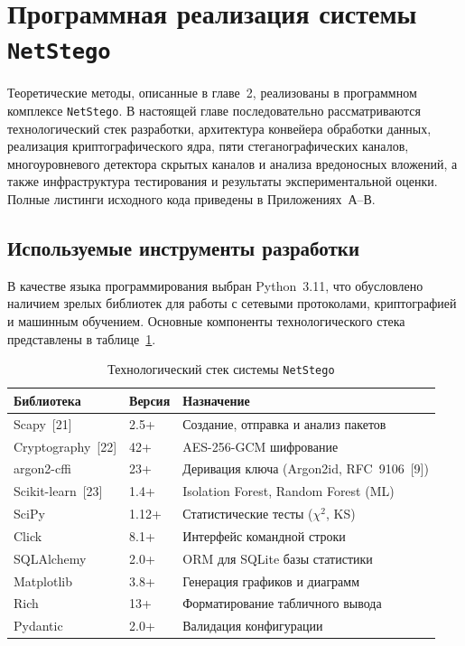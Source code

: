 \section{Программная реализация системы \texttt{NetStego}}

Теоретические методы, описанные в главе~2, реализованы в программном комплексе \texttt{NetStego}. В настоящей главе последовательно рассматриваются технологический стек разработки, архитектура конвейера обработки данных, реализация криптографического ядра, пяти стеганографических каналов, многоуровневого детектора скрытых каналов и анализа вредоносных вложений, а также инфраструктура тестирования и результаты экспериментальной оценки. Полные листинги исходного кода приведены в Приложениях~А--В.

\subsection{Используемые инструменты разработки}

В качестве языка программирования выбран Python~3.11, что обусловлено наличием зрелых библиотек для работы с сетевыми протоколами, криптографией и машинным обучением. Основные компоненты технологического стека представлены в таблице~\ref{tab:tech_stack}.

\begin{table}[htb]
\centering
\caption{Технологический стек системы \texttt{NetStego}}
\label{tab:tech_stack}
\small
\begin{tabular}{|l|l|p{7cm}|}
\hline
Библиотека & Версия & Назначение \\
\hline
Scapy~[21]          & 2.5+  & Создание, отправка и анализ пакетов \\
Cryptography~[22]   & 42+   & AES-256-GCM шифрование \\
argon2-cffi          & 23+   & Деривация ключа (Argon2id, RFC~9106~[9]) \\
Scikit-learn~[23]    & 1.4+  & Isolation Forest, Random Forest (ML) \\
SciPy                & 1.12+ & Статистические тесты ($\chi^2$, KS) \\
Click                & 8.1+  & Интерфейс командной строки \\
SQLAlchemy           & 2.0+  & ORM для SQLite базы статистики \\
Matplotlib           & 3.8+  & Генерация графиков и диаграмм \\
Rich                 & 13+   & Форматирование табличного вывода \\
Pydantic             & 2.0+  & Валидация конфигурации \\
\hline
\end{tabular}
\end{table}

